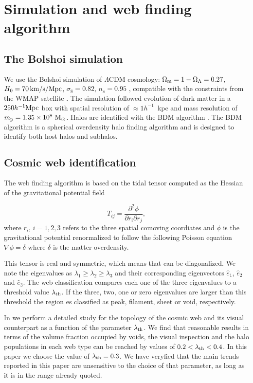 \documentclass{emulateapj}
\newcommand{\hmpc}{{\ifmmode{h^{-1}{\rm Mpc}}\else{$h^{-1}$Mpc }\fi}}
\begin{document}
\section{Simulation and web finding algorithm}
\label{sec:simulation}

\subsection{The Bolshoi simulation}
We use the Bolshoi simulation of $\Lambda$CDM cosmology: $\Omega_{\rm
  m}=1-\Omega_{\Lambda}=0.27$, $H_0=70\,\rm km/s/Mpc$,
$\sigma_8=0.82$, $n_s=0.95$ \citep{2011ApJ...740..102K}, compatible
with the constraints from the WMAP satellite
\citep{hinshaw_etal13}. The simulation followed evolution of dark
matter in a $250 \hmpc$ box with spatial resolution of $\approx
1h^{-1}$~kpc and mass resolution of $m_{\rm p}=1.35\times 10^8\ \rm
M_{\odot}$. Halos are identified with the BDM algorithm
\citep{1997astro.ph.12217K}. The BDM algorithm is  a spherical
overdensity halo finding algorithm and is designed to identify both
host halos and subhalos. 



\subsection{Cosmic web identification}
The web finding algorithm is based on the tidal tensor computed as the
Hessian of the  gravitational potential field

\begin{equation}
T_{ij} = \frac{\partial^2 \phi}{\partial r_i \partial r_j}, 
\end{equation}
%
where $r_{i}$, $i=1,2,3$ refers to the three spatial comoving
coordiates and $\phi$ is the gravitational potential renormalized to
follow the following Poisson equation $\nabla\phi=\delta$ where
$\delta$ is the matter overdensity.  

This tensor is real and symmetric, which means that can be
diagonalized. We note the eigenvalues as $\lambda_1\geq \lambda_2\geq
\lambda_3$ and their corresponding eigenvectors $\hat{e}_1$,
$\hat{e}_2$ and $\hat{e}_3$. The web classification compares each one
of the three eigenvalues to a threshold value $\lambda_{\rm th}$. If
the three, two, one or zero eigenvalues are larger than this threshold
the region es classified as peak, filament, sheet or void,
respectively.  

In \cite{Tweb} we perform a detailed study for the topology of the
cosmic web and its visual counterpart as a function of the parameter
$\lambda_{\rm th}$. We find that reasonable results in terms of the
volume fraction occupied by voids, the visual inspection and the halo
populations in each web type can be reached by values of $0.2<\lambda_{\rm
th}<0.4$. In this paper we choose the value of $\lambda_{\rm
  th}=0.3$. We have veryfied that the main trends reported in this
paper are unsensitive to the choice of that parameter, as long as it
is in the range already quoted.
\end{document}

